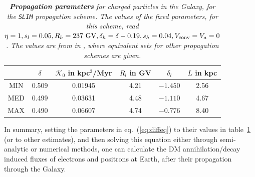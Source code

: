 \begin{table}[t]
\center
\begin{tabular}{c|ccccc}
  & $\delta$ & $\mathcal{K}_0$ in kpc$^2$/Myr & $R_l$ in GV & $\delta_l$ & $L$ in kpc  \\
\hline 
MIN  & 0.509 & 0.01945 & 4.21 & $-1.450$ & 2.56  \\
MED & 0.499 & 0.03631 & 4.48 &  $-1.110$ & 4.67  \\
MAX  & 0.490 & 0.06607 &  4.74 &  $-0.776$ & 8.40 
\end{tabular}
\caption[Propagation of charged particles in the Milky Way]{\em \small {\bfseries Propagation parameters} for charged particles in the Galaxy, for the \texttt{SLIM} propagation scheme. The values of the fixed parameters, for this scheme, read $\eta =1, s_l = 0.05, R_h = 237 \ {\rm GV}, \delta_h = \delta -0.19, s_h =0.04, V_{\rm conv} = V_a = 0$. The values are from  in \cite{CRpropagation}, where equivalent sets for other propagation schemes are given. 
\label{tab:proparam}}
\end{table}


\medskip

In summary, setting the parameters in eq.~(\ref{eq:diffeq}) to their values in table~\ref{tab:proparam} (or to other estimates), and then solving this equation either through semi-analytic or numerical methods, one can calculate the DM annihilation/decay induced fluxes of electrons and positrons at Earth, after their propagation through the Galaxy. 






